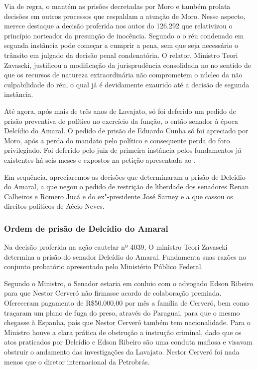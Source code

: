 Via de regra, o  mantém as prisões decretadas por Moro e também
prolata decisões em outros processos que respaldam a atuação de Moro.
Nesse aspecto, merece destaque a decisão proferida nos autos do 
126.292 que relativizou o princípio norteador da presunção de inocência.
Segundo o  o réu condenado em segunda instância pode começar a
cumprir a pena, sem que seja necessário o trânsito em julgado da decisão
penal condenatória. O relator, Ministro Teori Zavascki, justificou a
modificação da jurisprudência consolidada no  no sentido de que os
recursos de natureza extraordinária não comprometem o núcleo da não
culpabilidade do réu, o qual já é devidamente exaurido até a decisão de
segunda instância.

Até agora, após mais de três anos de Lavajato, só foi deferido um pedido
de prisão preventiva de político no exercício da função, o então senador
à época Delcídio do Amaral. O pedido de prisão de Eduardo Cunha só foi
apreciado por Moro, após a perda do mandato pelo político e consequente
perda do foro privilegiado. Foi deferido pelo juiz de primeira instância
pelos fundamentos já existentes há seis meses e expostos na petição
apresentada ao .

Em sequência, apreciaremos as decisões que determinaram a prisão de
Delcidio do Amaral, a que negou o pedido de restrição de liberdade dos
senadores Renan Calheiros e Romero Jucá e do ex"-presidente José Sarney e
a que cassou os direitos políticos de Aécio Neves.

\subsubsection{Ordem de prisão de Delcídio do Amaral}

Na decisão proferida na ação cautelar nº 4039, O ministro Teori Zavascki
determina a prisão do senador Delcídio do Amaral. Fundamenta suas razões
no conjunto probatório apresentado pelo Ministério Público Federal.

Segundo o Ministro, o Senador estaria em conluio com o advogado Edson
Ribeiro para que Nestor Cerveró não firmasse acordo de colaboração
premiada. Ofereceram pagamento de R\$50.000,00 por mês a família de
Cerveró, bem como traçaram um plano de fuga do preso, através do
Paraguai, para que o mesmo chegasse à Espanha, país que Nestor Cerveró
também tem nacionalidade. Para o Ministro houve a clara prática de
obstrução a instrução criminal, dado que os atos praticados por Delcídio
e Edson Ribeiro são uma conduta mafiosa e visavam obstruir o andamento
das investigações da Lavajato. Nestor Cerveró foi nada menos que o
diretor internacional da Petrobrás.

